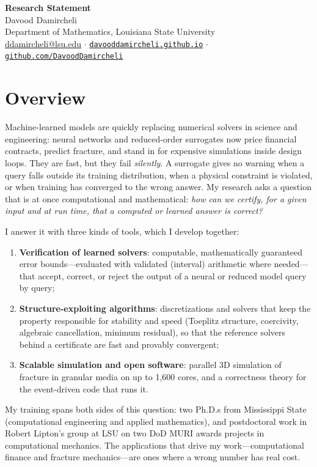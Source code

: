 \documentclass[11pt]{article}
\begin{document}
\begin{center}
{\LARGE\bfseries Research Statement}\\[3pt]
{\large Davood Damircheli}\\[1pt]
{\small Department of Mathematics, Louisiana State University\\
\href{mailto:ddamircheli@lsu.edu}{ddamircheli@lsu.edu} \;$\cdot$\;
\href{https://davooddamircheli.github.io}{\nolinkurl{davooddamircheli.github.io}} \;$\cdot$\;
\href{https://github.com/DavoodDamircheli}{\nolinkurl{github.com/DavoodDamircheli}}}
\end{center}
\vspace{-4pt}

\section*{Overview}

Machine-learned models are quickly replacing numerical solvers in science and
engineering: neural networks and reduced-order surrogates now price financial
contracts, predict fracture, and stand in for expensive simulations inside
design loops. They are fast, but they fail \emph{silently}. A surrogate gives
no warning when a query falls outside its training distribution, when a
physical constraint is violated, or when training has converged to the wrong
answer. My research asks a question that is at once computational and
mathematical: \emph{how can we certify, for a given input and at run time,
that a computed or learned answer is correct?}

I answer it with three kinds of tools, which I develop together:
\begin{enumerate}[label=(\roman*),leftmargin=2.2em]
\item \textbf{Verification of learned solvers}: computable, mathematically
      guaranteed error bounds---evaluated with validated (interval) arithmetic
      where needed---that accept, correct, or reject the output of a neural or
      reduced model query by query;
\item \textbf{Structure-exploiting algorithms}: discretizations and solvers
      that keep the property responsible for stability and speed (Toeplitz
      structure, coercivity, algebraic cancellation, minimum residual), so that
      the reference solvers behind a certificate are fast and provably convergent;
\item \textbf{Scalable simulation and open software}: parallel 3D simulation
      of fracture in granular media on up to 1{,}600 cores, and a correctness
      theory for the event-driven code that runs it.
\end{enumerate}
My training spans both sides of this question: two Ph.D.s from Mississippi
State (computational engineering and applied mathematics), and postdoctoral
work in Robert Lipton's group at LSU on two DoD MURI awards projects in
computational mechanics. %
The applications that drive my work---computational finance and fracture
mechanics---are ones where a wrong number has real cost.
\end{document}
